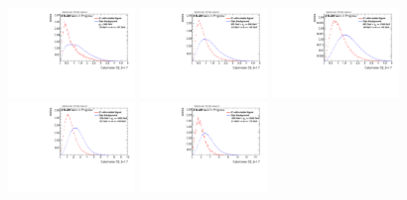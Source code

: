 \begin{figure}
\bigskip
\includegraphics[width=0.3\textwidth]{sascha_input/Appendix/Distributions/higgs/distributions/beta17/h_recoJet_D2_17_bin1.pdf} \hspace{1mm}
\includegraphics[width=0.3\textwidth]{sascha_input/Appendix/Distributions/higgs/distributions/beta17/h_recoJet_D2_17_bin2.pdf} \hspace{4mm}
\includegraphics[width=0.3\textwidth]{sascha_input/Appendix/Distributions/higgs/distributions/beta17/h_recoJet_D2_17_bin3.pdf} 
\bigskip
\includegraphics[width=0.3\textwidth]{sascha_input/Appendix/Distributions/higgs/distributions/beta17/h_recoJet_D2_17_bin4.pdf} \hspace{4mm}
\includegraphics[width=0.3\textwidth]{sascha_input/Appendix/Distributions/higgs/distributions/beta17/h_recoJet_D2_17_bin5.pdf} 


\end{figure}
